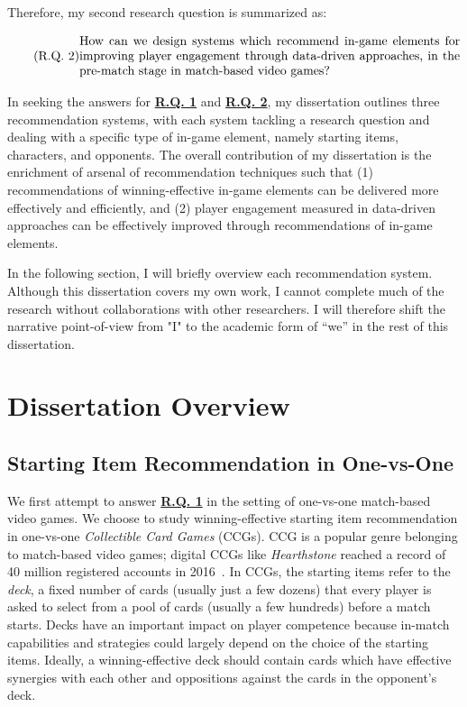 Therefore, my second research question is summarized as:

\begin{equation}
  \tag{R.Q. 2}\label{rq2}
  \parbox{\dimexpr\linewidth-4em}{%
    \strut
    How can we design systems which recommend in-game elements for improving player engagement through data-driven approaches, in the pre-match stage in match-based video games?
    \strut
  }
\end{equation}


In seeking the answers for \hyperref[rq1]{\textbf{R.Q. 1}} and \hyperref[rq2]{\textbf{R.Q. 2}}, my dissertation outlines three recommendation systems, with each system tackling a research question and dealing with a specific type of in-game element, namely starting items, characters, and opponents. The overall contribution of my dissertation is the enrichment of  arsenal of recommendation techniques such that (1) recommendations of winning-effective in-game elements can be delivered more effectively and efficiently, and (2) player engagement measured in data-driven approaches can be effectively improved through recommendations of in-game elements.

In the following section, I will briefly overview each recommendation system. Although this dissertation covers my own work, I cannot complete much of the research without collaborations with other researchers. I will therefore shift the narrative point-of-view from "I" to the academic form of “we” in the rest of this dissertation.


\section{Dissertation Overview}\label{sec:thesis_overview}

\subsection{Starting Item Recommendation in One-vs-One}\label{sec:thesis_overview:item_recom}

We first attempt to answer \hyperref[rq1]{\textbf{R.Q. 1}} in the setting of one-vs-one match-based video games. We choose to study winning-effective starting item recommendation in one-vs-one \textit{Collectible Card Games} (CCGs). CCG is a popular genre belonging to match-based video games; digital CCGs like \textit{Hearthstone} reached a record of 40 million registered accounts in 2016~\cite{hearthstonepopular}. In CCGs, the starting items refer to the \textit{deck}, a fixed number of cards (usually just a few dozens) that every player is asked to select from a pool of cards (usually a few hundreds) before a match starts. Decks have an important impact on player competence because in-match capabilities and strategies could largely depend on the choice of the starting items. Ideally, a winning-effective deck should contain cards which have effective synergies with each other and oppositions against the cards in the opponent's deck. 

